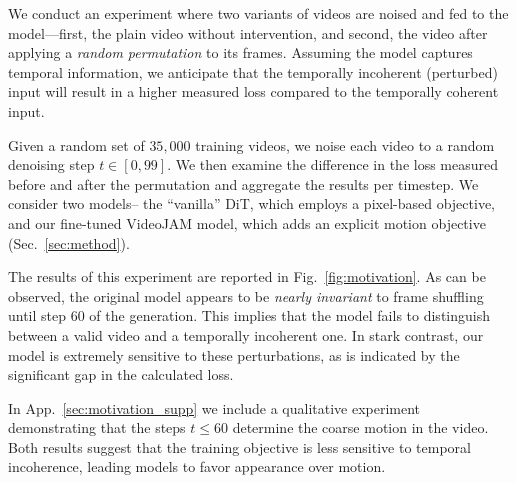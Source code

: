 We conduct an experiment where two variants of videos are noised and fed to the model—first, the plain video without intervention, and second, the video after applying a \emph{random permutation} to its frames. 
Assuming the model captures temporal information, we anticipate that the temporally incoherent (perturbed) input will result in a higher measured loss compared to the temporally coherent input.

Given a random set of $35,000$ training videos, we noise each video to a random denoising step $t\in[0,99]$. We then examine the difference in the loss measured before and after the permutation and aggregate the results per timestep. We consider two models-- the ``vanilla'' DiT, which employs a pixel-based objective, and our fine-tuned VideoJAM model, which adds an explicit motion objective (Sec.~\ref{sec:method}). 

The results of this experiment are reported in Fig.~\ref{fig:motivation}.
As can be observed, the original model appears to be \emph{nearly invariant} to frame shuffling until step $60$ of the generation. This implies that the model fails to distinguish between a valid video and a temporally incoherent one. In stark contrast, our model is extremely sensitive to these perturbations, as is indicated by the significant gap in the calculated loss. 

In App.~\ref{sec:motivation_supp} we include a qualitative experiment demonstrating that the steps $t\leq 60$ determine the coarse motion in the video. Both results suggest that the training objective is less sensitive to temporal incoherence, leading models to favor appearance over motion.

